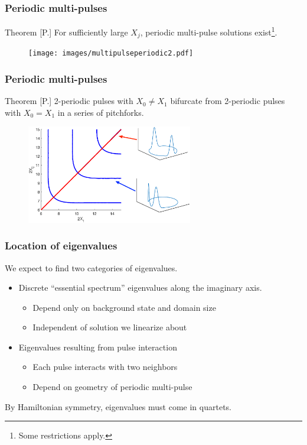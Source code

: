 \documentclass[16pt]{beamer}
\begin{document}
\begin{frame}
\frametitle{Periodic multi-pulses} 
	\fontsize{14}{7.2}\selectfont
    \begin{block}{Theorem [P.]}
    For sufficiently large $X_j$, periodic multi-pulse solutions exist\footnote{Some restrictions apply.}.

	\begin{figure}
	\begin{center}
	\texttt{[image: images/multipulseperiodic2.pdf]}
	\end{center}
	\end{figure}
    \end{block}
\end{frame}

\begin{frame}
\frametitle{Periodic multi-pulses} 
	\fontsize{14}{7.2}\selectfont
    \begin{block}{Theorem [P.]}
    2-periodic pulses with $X_0 \neq X_1$ bifurcate from 2-periodic pulses with $X_0 = X_1$ in a series of pitchforks.

	\begin{figure}
	\begin{center}
	\includegraphics[width=7.25cm]{images/periodicpitchforklabeled}
	\end{center}
	\end{figure}
    \end{block}
\end{frame}

\begin{frame}
	\frametitle{Location of eigenvalues}
	\fontsize{16}{7.2}\selectfont
	We expect to find two categories of eigenvalues.

	\begin{itemize}
		\item Discrete ``essential spectrum'' eigenvalues along the imaginary axis.
		\begin{itemize}
			\item Depend only on background state and domain size
			\item Independent of solution we linearize about
		\end{itemize}
		\item Eigenvalues resulting from pulse interaction 
		\begin{itemize}
			\item Each pulse interacts with two neighbors
			\item Depend on geometry of periodic multi-pulse
		\end{itemize}
	\end{itemize}
	\vspace{0.5cm}

	By Hamiltonian symmetry, eigenvalues must come in quartets.
\end{frame}
\end{document}
